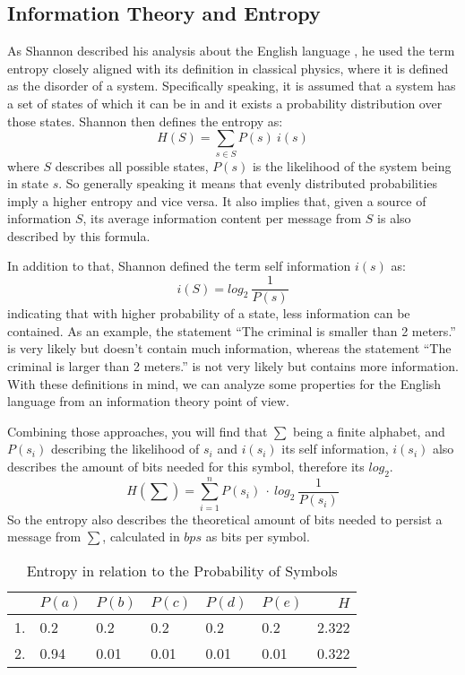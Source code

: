 \subsection{Information Theory and Entropy}
\par{
As Shannon described his analysis about the English language \cite{entropy}, he used the term entropy closely aligned with its definition in classical physics, where it is defined as the disorder of a system. Specifically speaking, it is assumed that a system has a set of states of which it can be in and it exists a probability distribution over those states. Shannon then defines the entropy as:
\[
H(S) = \sum_{s \in S} P(s) \: i(s)
\]
where $S$ describes all possible states, $P(s)$ is the likelihood of the system being in state $s$. So generally speaking it means that evenly distributed probabilities imply a higher entropy and vice versa.
It also implies that, given a source of information $S$, its average information content per message from $S$ is also described by this formula.}

\par{
In addition to that, Shannon defined the term self information $i(s)$ as:
\[
i(S) = log_{2} \: \frac{1}{P(s)}
\]
indicating that with higher probability of a state, less information can be contained. As an example, the statement \enquote{The criminal is smaller than 2 meters.} is very likely but doesn't contain much information, whereas the statement \enquote{The criminal is larger than 2 meters.} is not very likely but contains more information. With these definitions in mind, we can analyze some properties for the English language from an information theory point of view.
}

\par{
Combining those approaches, you will find that $\sum$ being a finite alphabet, and $P(s_i)$ describing the likelihood of $s_i$ and $i(s_i)$ its self information, $i(s_i)$ also describes the amount of bits needed for this symbol, therefore its $log_2$.
\[
	H(\sum) = \sum_{i = 1}^{n} P(s_i) \: \cdot \: log_{2} \: \frac{1}{P(s_i) }
\]
So the entropy 	also describes the theoretical amount of bits needed to persist a message from $\sum$, calculated in $bps$ as bits per symbol.

\begin{table}
	\centering
\begin{tabular}[p]{l|l|l|l|l|l|r}
	& $P(a)$ & $P(b)$ & $P(c)$ & $P(d)$ & $P(e)$ & $H$ \\
	\hline
	1. & 0.2 & 0.2 & 0.2 & 0.2 & 0.2 & 2.322 \\
	2. & 0.94 & 0.01 & 0.01 & 0.01 & 0.01 & 0.322
	\label{tab:heisetabelle}
\end{tabular}
	\caption{Entropy in relation to the Probability of Symbols}
\end{table}
}
